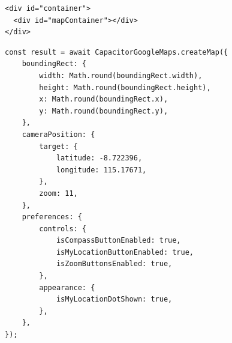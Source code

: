 \begin{itemize}
\begin{lstlisting}[label={lst:htmlkontainergooglemap}, caption=Kontainer pada HTML untuk Peta Capacitor CommunityGoogle Maps]
<div id="container">
  <div id="mapContainer"></div>
</div>
\end{lstlisting}

\begin{lstlisting}[label={lst:createMapGoogleMaps}, caption=\textit{Method} createMap() Pada Capacitor Community Google Maps]
const result = await CapacitorGoogleMaps.createMap({
	boundingRect: {
		width: Math.round(boundingRect.width),
        height: Math.round(boundingRect.height),
        x: Math.round(boundingRect.x),
        y: Math.round(boundingRect.y),
    },
    cameraPosition: {
        target: {
        	latitude: -8.722396,
            longitude: 115.17671,
        },
        zoom: 11,
    },
    preferences: {
        controls: {
    	    isCompassButtonEnabled: true,
            isMyLocationButtonEnabled: true,
            isZoomButtonsEnabled: true,
        },
        appearance: {
            isMyLocationDotShown: true,
        },
    },
});
\end{lstlisting}


\end{itemize}
